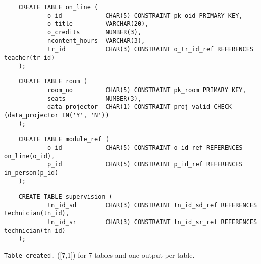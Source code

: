 \documentclass[11pt, english]{article}
\begin{document}
	{\scriptsize\begin{verbatim}
	CREATE TABLE on_line (
	        o_id            CHAR(5) CONSTRAINT pk_oid PRIMARY KEY,
	        o_title         VARCHAR(20),
	        o_credits       NUMBER(3),
	        ncontent_hours  VARCHAR(3),
	        tr_id           CHAR(3) CONSTRAINT o_tr_id_ref REFERENCES teacher(tr_id)
	);
	\end{verbatim}}

	{\scriptsize\begin{verbatim}
	CREATE TABLE room (
	        room_no         CHAR(5) CONSTRAINT pk_room PRIMARY KEY,
	        seats           NUMBER(3),
	        data_projector  CHAR(1) CONSTRAINT proj_valid CHECK (data_projector IN('Y', 'N'))
	);
	\end{verbatim}}

	{\scriptsize\begin{verbatim}
	CREATE TABLE module_ref (
	        o_id            CHAR(5) CONSTRAINT o_id_ref REFERENCES on_line(o_id),
	        p_id            CHAR(5) CONSTRAINT p_id_ref REFERENCES in_person(p_id)
	);
	\end{verbatim}}

	{\scriptsize\begin{verbatim}
	CREATE TABLE supervision (
        	tn_id_sd        CHAR(3) CONSTRAINT tn_id_sd_ref REFERENCES technician(tn_id),
        	tn_id_sr        CHAR(3) CONSTRAINT tn_id_sr_ref REFERENCES technician(tn_id)
	);
	\end{verbatim}}

	\texttt{Table created.} ([7,1]) for 7 tables and one output per table.

%
\newpage
\end{document}
